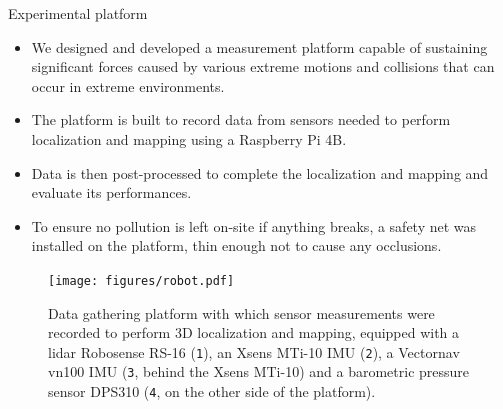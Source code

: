 \documentclass[final,hyperref={pdfpagelabels=false}]{beamer}
\begin{document}
\begin{frame}[t]
\begin{columns}[t]
\begin{column}{.465\textwidth}
\begin{block}{Experimental platform}
	\begin{itemize}
		\item We designed and developed a measurement platform capable of sustaining significant forces caused by various extreme motions and collisions that can occur in extreme environments.
		\item The platform is built to record data from sensors needed to perform localization and mapping using a Raspberry Pi 4B.
		\item Data is then post-processed to complete the localization and mapping and evaluate its performances.
		\item To ensure no pollution is left on-site if anything breaks, a safety net was installed on the platform, thin enough not to cause any occlusions.
	\end{itemize}
	\centering
	\begin{figure}
		\texttt{[image: figures/robot.pdf]}
		\caption{Data gathering platform with which sensor measurements were recorded to perform 3D localization and mapping, equipped with a lidar Robosense RS-16 (\texttt{1}), an Xsens MTi-10 IMU (\texttt{2}), a Vectornav vn100 IMU (\texttt{3}, behind the Xsens MTi-10) and a barometric pressure sensor DPS310 (\texttt{4}, on the other side of the platform).}
	\end{figure}
\end{block}


\end{column}
\end{columns}
\end{frame}
\end{document}
